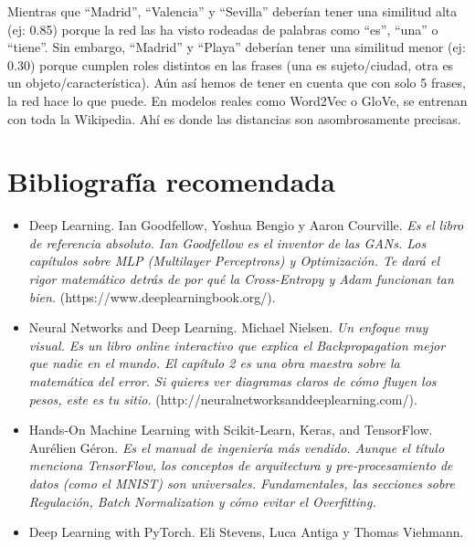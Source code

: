 \documentclass[a4paper,11pt]{article}
\begin{document}
Mientras que ``Madrid'', ``Valencia'' y ``Sevilla'' deberían tener una
similitud alta (ej: 0.85) porque la red las ha visto rodeadas de
palabras como ``es'', ``una'' o ``tiene''. Sin embargo, ``Madrid'' y
``Playa'' deberían tener una similitud menor (ej: 0.30) porque cumplen
roles distintos en las frases (una es sujeto/ciudad, otra es un
objeto/característica). Aún así hemos de tener en cuenta que con solo 5
frases, la red hace lo que puede. En modelos reales como Word2Vec o
GloVe, se entrenan con toda la Wikipedia. Ahí es donde las distancias
son asombrosamente precisas.














\newpage
\section{Bibliografía recomendada}

\begin{itemize}

\item
  Deep Learning. Ian Goodfellow, Yoshua Bengio y Aaron Courville. \emph{Es el
  libro de referencia absoluto. Ian Goodfellow es el inventor de las GANs. Los
  capítulos sobre MLP (Multilayer Perceptrons) y Optimización. Te dará el rigor
  matemático detrás de por qué la Cross-Entropy y Adam funcionan tan bien.}
  (https://www.deeplearningbook.org/).

\item
  Neural Networks and Deep Learning. Michael Nielsen.  \emph{Un enfoque muy
  visual. Es un libro online interactivo que explica el Backpropagation mejor
  que nadie en el mundo. El capítulo 2 es una obra maestra sobre la matemática
  del error. Si quieres ver diagramas claros de cómo fluyen los pesos, este es
  tu sitio.}  (http://neuralnetworksanddeeplearning.com/).

\item
  Hands-On Machine Learning with Scikit-Learn, Keras, and TensorFlow. Aurélien
  Géron. \emph{Es el manual de ingeniería más vendido. Aunque el título menciona
  TensorFlow, los conceptos de arquitectura y pre-procesamiento de datos (como
  el MNIST) son universales.  Fundamentales, las secciones sobre Regulación,
  Batch Normalization y cómo evitar el Overfitting.}
  
\item
  Deep Learning with PyTorch. Eli Stevens, Luca Antiga y Thomas Viehmann.
\end{itemize}
\end{document}
